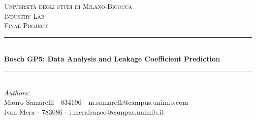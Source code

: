 \begin{titlepage}

\newcommand{\HRule}{\rule{\linewidth}{0.5mm}} %

\center %
 

\textsc{\LARGE Università degli studi di Milano-Bicocca}\\[1cm] %
\textsc{\Large Industry Lab }\\[0.3cm] %
\textsc{\large Final Project}\\[0.1cm] %


\HRule \\[0.4cm]
{ \huge \bfseries Bosch GP5: Data Analysis and Leakage Coefficient 	Prediction}\\[0.4cm] %
\HRule \\[1.5cm]
 

\large
\emph{Authors:}\\
Mauro Samarelli - 834196 - m.samarelli@campus.unimib.com \\   %
Ivan Mera - 783086 - i.merafranco@campus.unimib.it   \\[1cm] %




\end{titlepage}
